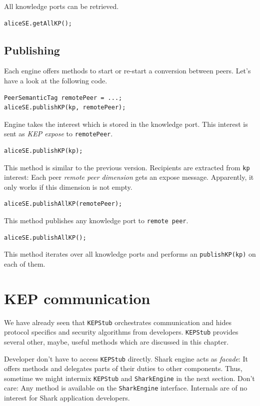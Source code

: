 All knowledge ports can be retrieved.
\begin{verbatim}
aliceSE.getAllKP();
\end{verbatim}

\subsection{Publishing}
Each engine offers methods to start or re-start a conversion between peers.
Let's have a look at the following code.

\begin{verbatim}
PeerSemanticTag remotePeer = ...;
aliceSE.publishKP(kp, remotePeer);
\end{verbatim}

Engine takes the interest which is stored in the knowledge port. This interest is sent as {\it KEP expose} to {\tt remotePeer}.

\begin{verbatim}
aliceSE.publishKP(kp);
\end{verbatim}

This method is similar to the previous version. Recipients are extracted from {\tt kp} interest: Each peer {\it remote peer dimension} gets an expose message.
Apparently, it only works if this dimension is not empty.

\begin{verbatim}
aliceSE.publishAllKP(remotePeer);
\end{verbatim}

This method publishes any knowledge port to {\tt remote peer}.

\begin{verbatim}
aliceSE.publishAllKP();
\end{verbatim}

This method iterates over all knowledge ports and performs an {\tt publishKP(kp)} on each of them.

\section{KEP communication}
\label{ref:sec:KEP}
We have already seen that {\tt KEPStub} orchestrates communication and hides protocol specifics and security algorithms from developers. {\tt KEPStub} provides several other, maybe, useful methods which are discussed in this chapter. 

Developer don't have to access {\tt KEPStub} directly. Shark engine acts as {\it facade}: It offers methods and delegates parts of their duties to other components. Thus, sometime we might intermix {\tt KEPStub} and {\tt SharkEngine} in the next section. Don't care: Any method is available on the {\tt SharkEngine} interface. Internals are of no interest for Shark application developers.

